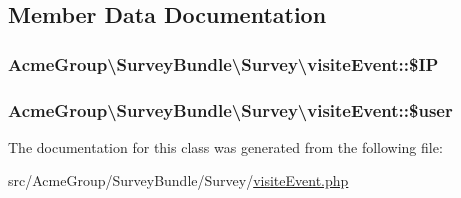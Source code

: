 \subsection{Member Data Documentation}
\hypertarget{class_acme_group_1_1_survey_bundle_1_1_survey_1_1visite_event_aa52a499aad007681c33f821e634a7ba9}{
\subsubsection[{\$\+I\+P}]{\setlength{\rightskip}{0pt plus 5cm}Acme\+Group\textbackslash{}\+Survey\+Bundle\textbackslash{}\+Survey\textbackslash{}visite\+Event\+::\$\+I\+P\hspace{0.3cm}{\ttfamily [protected]}}}\label{class_acme_group_1_1_survey_bundle_1_1_survey_1_1visite_event_aa52a499aad007681c33f821e634a7ba9}
\hypertarget{class_acme_group_1_1_survey_bundle_1_1_survey_1_1visite_event_ae75e38753c87c66885e745e47c29ed32}{
\subsubsection[{\$user}]{\setlength{\rightskip}{0pt plus 5cm}Acme\+Group\textbackslash{}\+Survey\+Bundle\textbackslash{}\+Survey\textbackslash{}visite\+Event\+::\$user\hspace{0.3cm}{\ttfamily [protected]}}}\label{class_acme_group_1_1_survey_bundle_1_1_survey_1_1visite_event_ae75e38753c87c66885e745e47c29ed32}


The documentation for this class was generated from the following file\+:\begin{DoxyCompactItemize}
\item 
src/\+Acme\+Group/\+Survey\+Bundle/\+Survey/\hyperlink{visite_event_8php}{visite\+Event.\+php}\end{DoxyCompactItemize}
